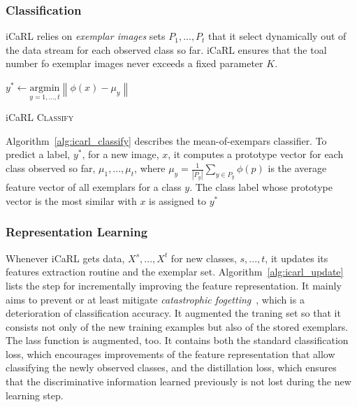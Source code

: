\subsubsection{Classification}
\label{sec:icarl_classification}

iCaRL relies on \textit{exemplar images} sets $P_1, ..., P_t$ that it select dynamically out of the data stream for each observed class so far. iCaRL ensures that the toal number fo exemplar images never exceeds a fixed parameter $K$.

\begin{algorithm}[ht]
  $y^{*} \leftarrow \underset{y = 1, ..., t}{\textrm{argmin}} \left\| \phi(x) - \mu_y \right\|$  \\
  
\caption{ iCaRL \textsc{Classify} \label{alg:icarl_classify}}
\end{algorithm}

Algorithm~\ref{alg:icarl_classify} describes the mean-of-exempars classifier. To predict a label, $y^*$, for a new image, $x$, it computes a prototype vector for each class observed so far, $\mu_1, ..., \mu_t$, where $\mu_y = \frac{1}{\left| P_y \right|} \sum_{y \in P_y} \phi\left( p \right)$ is the average feature vector of all exemplars for a class $y$. The class label whose prototype vector is the most similar with $x$ is assigned to $y^*$

\subsubsection{Representation Learning}
\label{sec:icarl_learning}

Whenever iCaRL gets data, $X^s, ..., X^t$ for new classes, $s, ..., t$, it updates its features extraction routine and the exemplar set. Algorithm~\ref{alg:icarl_update} lists the step for incrementally improving the feature representation. It mainly aims to prevent or at least mitigate \textit{catastrophic fogetting}~\cite{McCloskey:1989aa}, which is a deterioration of classification accuracy. It augmented the traning set so that it consists not only of the new training examples but also of the stored exemplars. The lass function is augmented, too. It contains both the standard classification loss, which encourages improvements of the feature representation that allow classifying the newly observed classes, and the distillation loss, which ensures that the discriminative information learned previously is not lost during the new learning step.

